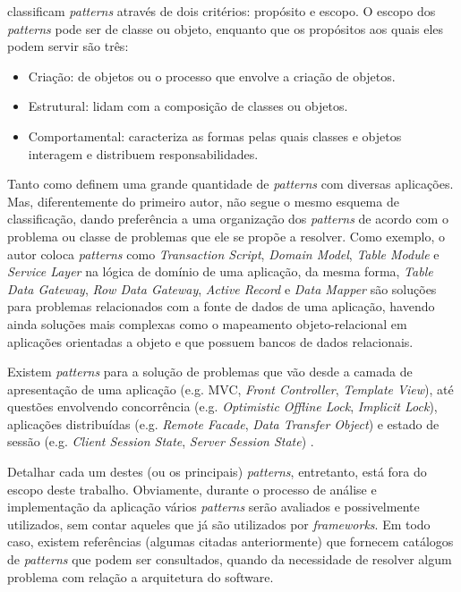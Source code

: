 \documentclass[diss]{template/setrem}
\begin{document}
\citet{Gamma1998} classificam \emph{patterns} através de dois critérios: propósito e escopo. O escopo dos \emph{patterns} pode ser de classe ou objeto, enquanto que os propósitos aos quais eles podem servir são três:
\begin{itemize}
	\item Criação: de objetos ou o processo que envolve a criação de objetos.
	\item Estrutural: lidam com a composição de classes ou objetos.
	\item Comportamental: caracteriza as formas pelas quais classes e objetos interagem e distribuem responsabilidades.
\end{itemize}

Tanto \citet{Gamma1998} como \citet{Fowler2002} definem uma grande quantidade de \emph{patterns} com diversas aplicações. Mas, diferentemente do primeiro autor, \citet{Fowler2002} não segue o mesmo esquema de classificação, dando preferência a uma organização dos \emph{patterns} de acordo com o problema ou classe de problemas que ele se propõe a resolver. Como exemplo, o autor coloca \emph{patterns} como \emph{Transaction Script}, \emph{Domain Model}, \emph{Table Module} e \emph{Service Layer} na lógica de domínio de uma aplicação, da mesma forma, \emph{Table Data Gateway}, \emph{Row Data Gateway}, \emph{Active Record} e \emph{Data Mapper} são soluções para problemas relacionados com a fonte de dados de uma aplicação, havendo ainda soluções mais complexas como o mapeamento objeto-relacional em aplicações orientadas a objeto e que possuem bancos de dados relacionais.

Existem \emph{patterns} para a solução de problemas que vão desde a camada de apresentação de uma aplicação (e.g. MVC, \emph{Front Controller}, \emph{Template View}), até questões envolvendo concorrência (e.g. \emph{Optimistic Offline Lock}, \emph{Implicit Lock}), aplicações distribuídas (e.g. \emph{Remote Facade}, \emph{Data Transfer Object}) e estado de sessão (e.g. \emph{Client Session State}, \emph{Server Session State}) \citep{Fowler2002}.

Detalhar cada um destes (ou os principais) \emph{patterns}, entretanto, está fora do escopo deste trabalho. Obviamente, durante o processo de análise e implementação da aplicação vários \emph{patterns} serão avaliados e possivelmente utilizados, sem contar aqueles que já são utilizados por \emph{frameworks}. Em todo caso, existem referências (algumas citadas anteriormente) que fornecem catálogos de \emph{patterns} que podem ser consultados, quando da necessidade de resolver algum problema com relação a arquitetura do software.
\end{document}
